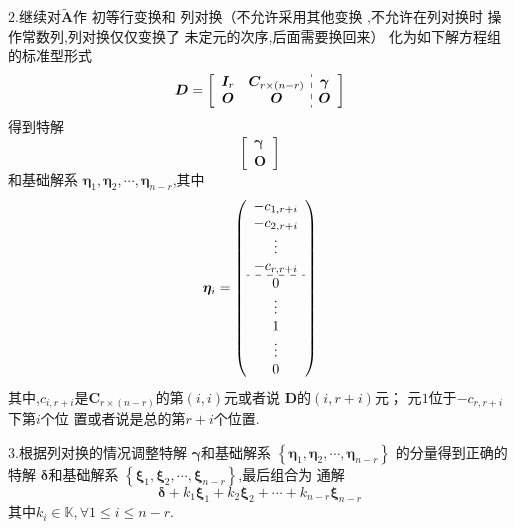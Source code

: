 \begin{formal}
\begin{theorem}[求解$\bm{Ax}=\bm{\beta}$的方法]
$2.$继续对$\widetilde{\bm{A}}$作
初等行变换和
列对换（不允许采用其他变换
,不允许在列对换时
操作常数列,列对换仅仅变换了
未定元的次序,后面需要换回来）
化为如下解方程组的标准型形式
\[
\bm{D} =
\left [
    \begin{array}{c:c}
        \begin{matrix}
            \bm{I}_r & \bm{C}_{r
            \times \left(n - r\right)}\\
            \bm{O} & \bm{O}
        \end{matrix}
        &
        \begin{matrix}
            \bm{\gamma}\\
            \bm{O}
        \end{matrix}
    \end{array}
\right ]
\]
得到特解
\[
\begin{bmatrix}
    \bm{\gamma}\\
    \bm{O}
\end{bmatrix}
\]和基础解系
$\bm{\eta}_1,\bm{\eta}_2,\cdots,
\bm{\eta}_{n - r}$,其中
\[
\bm{\eta}_i
=\left ( 
    \begin{array}{c}
        -c_{1,r+i}\\
        -c_{2,r+i}\\
        \vdots \\
        -c_{r,r+i}\\
        \hdashline
        0\\
        \vdots \\
        1\\
        \vdots\\
        0
    \end{array}
\right )
\]
其中,$c_{i,r+i}$是$\bm{C}_{
    r\times\left(n - r\right)
}$的第$\left(i,i\right)$元或者说
$\bm{D}$的$\left(i,r+i\right)$元；
元$1$位于$-c_{r,r+i}$下第$i$个位
置或者说是总的第$r + i$个位置.

$3.$根据列对换的情况调整特解
$\bm{\gamma}$和基础解系
$\left\{\bm{\eta}_1,\bm{\eta}_2,\cdots,\bm{\eta}_{n - r}
\right\}$
的分量得到正确的特解
$\bm{\delta }$和基础解系
$\left\{\bm{\xi}_1,\bm{\xi}_2,\cdots
,\bm{\xi}_{n - r}\right\}$,最后组合为
通解
\[
\bm{\delta}+k_1\bm{\xi}_1+k_2\bm{\xi}_2
+\cdots+k_{n - r}\bm{\xi}_{n - r}
\]
其中$k_i \in \mathbb{K},\forall 1\leqslant i\leqslant n-r.$
\end{theorem}
\end{formal}
